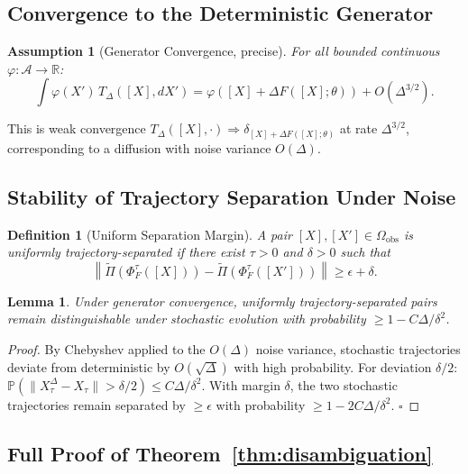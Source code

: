 \documentclass[12pt, oneside]{article}
\newtheorem{lemma}[theorem]{Lemma}
\newtheorem{definition}[theorem]{Definition}
\newtheorem{assumption}[theorem]{Assumption}
\newcommand{\Ftil}{\widetilde{\Pi}}
\begin{document}
\subsection{Convergence to the Deterministic Generator}

\begin{assumption}[Generator Convergence, precise]
For all bounded continuous $\varphi : \mathcal{A} \to \mathbb{R}$:
\[
\int \varphi(X')\,T_\Delta([X],dX') = \varphi([X] + \Delta F([X];\theta)) + O(\Delta^{3/2}).
\]
\end{assumption}

This is weak convergence $T_\Delta([X],\cdot) \Rightarrow \delta_{[X]+\Delta F([X];\theta)}$
at rate $\Delta^{3/2}$, corresponding to a diffusion with noise variance $O(\Delta)$.

\subsection{Stability of Trajectory Separation Under Noise}

\begin{definition}[Uniform Separation Margin]
A pair $[X],[X'] \in \Omega_{\mathrm{obs}}$ is \emph{uniformly trajectory-separated} if
there exist $\tau > 0$ and $\delta > 0$ such that
\[
\left\| \Ftil(\Phi^\tau_F([X])) - \Ftil(\Phi^\tau_F([X'])) \right\| \ge \epsilon + \delta.
\]
\end{definition}

\begin{lemma}
Under generator convergence, uniformly trajectory-separated pairs remain distinguishable
under stochastic evolution with probability $\ge 1 - C\Delta/\delta^2$.
\end{lemma}
\begin{proof}
By Chebyshev applied to the $O(\Delta)$ noise variance, stochastic trajectories deviate
from deterministic by $O(\sqrt{\Delta})$ with high probability. For deviation $\delta/2$:
$\mathbb{P}(\|X_\tau^\Delta - X_\tau\| > \delta/2) \le C\Delta/\delta^2$.
With margin $\delta$, the two stochastic trajectories remain separated by $\ge \epsilon$
with probability $\ge 1 - 2C\Delta/\delta^2$. $\square$
\end{proof}

\subsection{Full Proof of Theorem~\ref{thm:disambiguation}}
\end{document}
